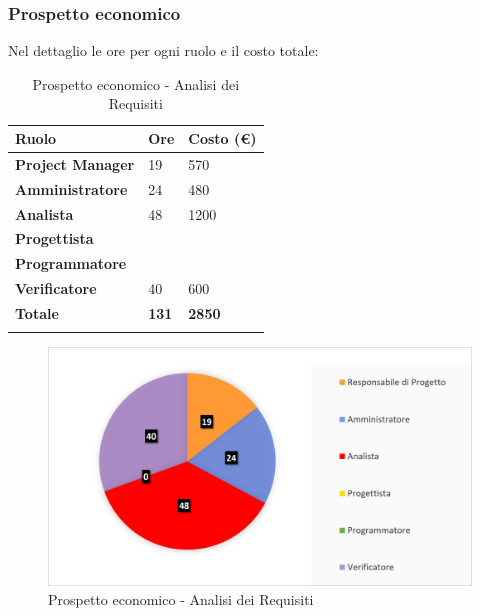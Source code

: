 \subsubsection{Prospetto economico}
Nel dettaglio le ore per ogni ruolo e il costo totale: 
\begin{center}
	\def\arraystretch{1.6}
	\bgroup
	\begin{longtable}{| p{4cm} | p{1cm} | p{2cm} |}
		\hline
		\textbf{Ruolo} & \textbf{Ore} & \textbf{Costo (€)} \\ 
		
		\hline \hline  
		
		\textbf{Project Manager} & {19} & {570} \\ 
		\hline 
		
		\textbf{Amministratore} & {24} & {480} \\ 
		\hline 
		
		\textbf{Analista} & {48} & {1200} \\ 
		\hline 
		
		\textbf{Progettista} & {} & {} \\ 
		\hline 
		
		\textbf{Programmatore} & {} & {} \\ 
		\hline 
		
		\textbf{Verificatore} & {40} & {600} \\ 
		\hline 
		
		\textbf{Totale} & \textbf{131} & \textbf{2850} \\ 
		\hline 
		
		
		\hline 
		
		\caption{Prospetto economico - Analisi dei Requisiti}
	\end{longtable}
	\egroup
\end{center}
\begin{figure}[H]
	\centering
	\includegraphics[width= 14cm]{immagini/ar_torta.png}
	\caption{Prospetto economico - Analisi dei Requisiti}
\end{figure}
\newpage


